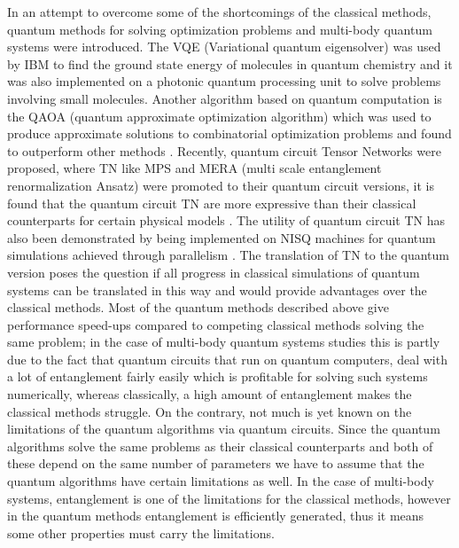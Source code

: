 \documentclass{physics_article}
\begin{document}
	In an attempt to overcome some of the shortcomings of the classical methods, quantum methods for solving optimization problems and multi-body quantum systems were introduced. The VQE (Variational quantum eigensolver) was used by IBM to find the ground state energy of molecules in  quantum chemistry \cite{kandala_mezzacapo_temme_takita_brink_chow_gambetta_2017} and it was also implemented on a photonic quantum processing unit \cite{peruzzo_mcclean_shadbolt_yung_zhou_love_aspuru-guzik_obrien_2014} to solve problems involving small molecules. Another algorithm based on quantum computation is the QAOA (quantum approximate optimization algorithm) which was used to produce approximate solutions to combinatorial optimization problems \cite{https://doi.org/10.48550/arxiv.1411.4028} and found to outperform other methods \cite{PhysRevX.10.021067}. Recently, quantum circuit Tensor Networks were proposed, where TN like MPS and MERA (multi scale entanglement renormalization Ansatz)\cite{vidal_2008} were promoted to their quantum circuit versions, it is found that the quantum circuit TN are more expressive than their classical counterparts for certain physical models \cite{haghshenas_gray_potter_chan_2022}. The utility of quantum circuit TN has also been demonstrated by being implemented on NISQ machines for quantum simulations achieved through parallelism \cite{barratt_dborin_bal_stojevic_pollmann_green_2021}. The translation of TN to the quantum version poses the question if all progress in classical simulations of quantum systems can be translated in this way and would provide advantages over the classical methods. Most of the quantum methods described above give performance speed-ups compared to competing classical methods solving the same problem; in the case of multi-body quantum systems studies this is partly due to the fact that quantum circuits that run on quantum computers, deal with a lot of entanglement fairly easily which is profitable for solving such systems numerically, whereas classically, a high amount of entanglement makes the classical methods struggle. On the contrary, not much is yet known on the limitations of the quantum algorithms via quantum circuits. Since the quantum algorithms solve the same problems as their classical counterparts and both of these depend on the same number of parameters we have to assume that the quantum algorithms have certain limitations as well. In the case of multi-body systems, entanglement is one of the limitations for the classical methods, however in the quantum methods entanglement is efficiently generated, thus it means some other properties must carry the limitations. 
\end{document}

